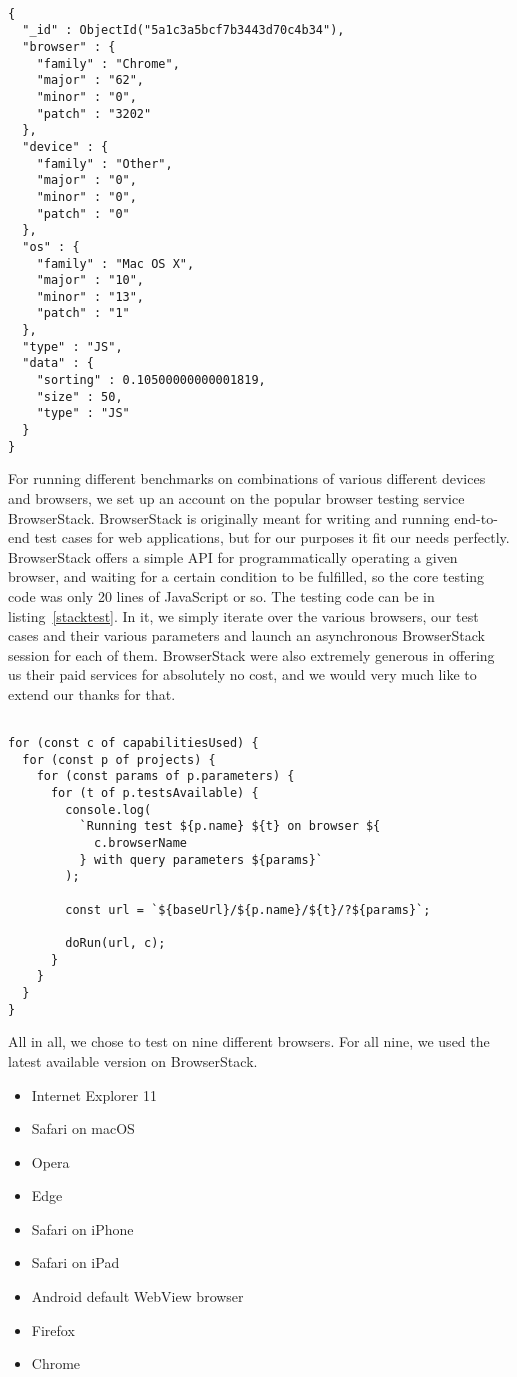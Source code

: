 \documentclass[conference]{IEEEtran}
\begin{document}
\begin{lstlisting}[caption={BrowserStack testing code},label=mongodata, basicstyle=\scriptsize]

{
  "_id" : ObjectId("5a1c3a5bcf7b3443d70c4b34"),
  "browser" : {
    "family" : "Chrome",
    "major" : "62",
    "minor" : "0",
    "patch" : "3202"
  },
  "device" : {
    "family" : "Other",
    "major" : "0",
    "minor" : "0",
    "patch" : "0"
  },
  "os" : {
    "family" : "Mac OS X",
    "major" : "10",
    "minor" : "13",
    "patch" : "1"
  },
  "type" : "JS",
  "data" : {
    "sorting" : 0.10500000000001819,
    "size" : 50,
    "type" : "JS"
  }
}
\end{lstlisting}

For running different benchmarks on combinations of various different
devices and browsers, we set up an account on the popular browser testing
service BrowserStack. BrowserStack is originally meant for writing and running
end-to-end test cases for web applications, but for our purposes it fit our
needs perfectly. BrowserStack offers a simple API for programmatically
operating a given browser, and waiting for a certain condition to be fulfilled,
so the core testing code was only 20 lines of JavaScript or so. The testing
code can be in listing~\ref{stacktest}. In it, we simply iterate over the
various browsers, our test cases and their various parameters and launch an
asynchronous BrowserStack session for each of them. BrowserStack were also
extremely generous in offering us their paid services for absolutely no cost,
and we would very much like to extend our thanks for that.

\begin{lstlisting}[caption={BrowserStack testing code},label=stacktest, basicstyle=\scriptsize]

for (const c of capabilitiesUsed) {
  for (const p of projects) {
    for (const params of p.parameters) {
      for (t of p.testsAvailable) {
        console.log(
          `Running test ${p.name} ${t} on browser ${
            c.browserName
          } with query parameters ${params}`
        );

        const url = `${baseUrl}/${p.name}/${t}/?${params}`;

        doRun(url, c);
      }
    }
  }
}
\end{lstlisting}

All in all, we chose to test on nine different browsers. For all nine, we used
the latest available version on BrowserStack.

\begin{itemize}
  \item Internet Explorer 11
  \item Safari on macOS
  \item Opera
  \item Edge
  \item Safari on iPhone
  \item Safari on iPad
  \item Android default WebView browser
  \item Firefox
  \item Chrome
\end{itemize}
\end{document}
